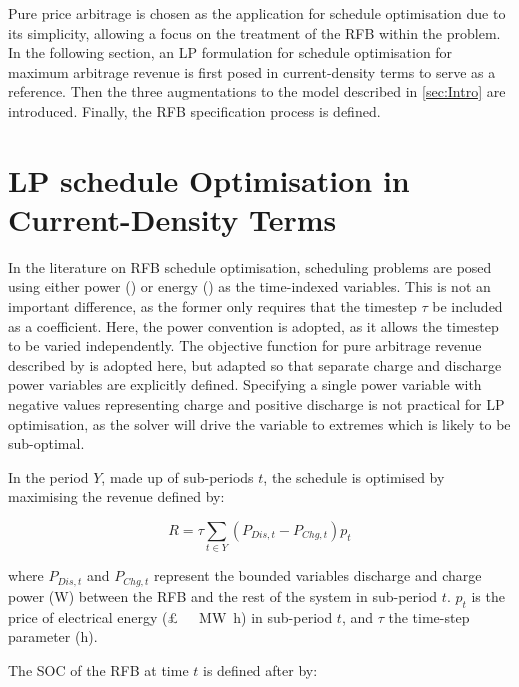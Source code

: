 \documentclass[preprint,3p,review,authoryear,10pt]{elsarticle}
\begin{document}
Pure price arbitrage is chosen as the application for schedule optimisation due to its simplicity, allowing a focus on the treatment of the RFB within the problem. In the following section, an LP formulation for schedule optimisation for maximum arbitrage revenue is first posed in current-density terms to serve as a reference. Then the three augmentations to the model described in \cref{sec:Intro} are introduced. Finally, the RFB specification process is defined.

\section{LP schedule Optimisation in Current-Density Terms}
\label{Model_Formulation_LP_Reference_Current_Density_Terms}

In the literature on RFB schedule optimisation, scheduling problems are posed using either power (\cite{Chen2012,Hu2010,Nguyen2015}) or energy (\cite{Johnston2015,Vaca2017}) as the time-indexed variables. This is not an important difference, as the former only requires that the timestep $\tau$ be included as a coefficient. Here, the power convention is adopted, as it allows the timestep to be varied independently. The objective function for pure arbitrage revenue described by \cite{Hu2010} is adopted here, but adapted so that separate charge and discharge power variables are explicitly defined. Specifying a single power variable with negative values representing charge and positive discharge is not practical for LP optimisation, as the solver will drive the variable to extremes which is likely to be sub-optimal.

In the period $Y$, made up of sub-periods $t$, the schedule is optimised by maximising the revenue defined by:

\begin{equation}
\label{eqn:Lit_Review_LP_Obj_Func}
R = \tau \sum_{t \in Y} (P_{Dis,t} - P_{Chg,t}) p_t
\end{equation}

where $P_{Dis,t}$ and $P_{Chg,t}$ represent the bounded variables discharge and charge power (\si{\watt}) between the RFB and the rest of the system in sub-period $t$. $p_t$ is the price of electrical energy (\SI[sticky-per, bracket-unit-denominator = false]{}[\pounds]{\per\mega\watt\hour}) in sub-period $t$, and $\tau$ the time-step parameter  (\si{\hour}). 

The SOC of the RFB at time $t$ is defined after \cite{Gomes2017} by:
\end{document}
